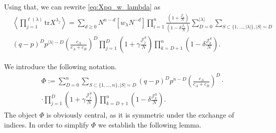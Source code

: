 \documentclass{article}
\newcommand{\tr}{\mathrm{tr}}
\theoremstyle{plain}
\theoremstyle{definition}
\numberwithin{equation}{section}
\begin{document}
Using that, we can rewrite \eqref{eq:Xpq_w_lambda} as
\begin{equation}
    \label{eq:Xpq_less_S}
    \begin{aligned}
        & \left\langle \prod_{j=1}^{\ell(\lambda)} \tr X^{\lambda_{j}} \right\rangle = \sum\limits_{d\ge 0}  N^{n- d} [w_\lambda N^{-d}]\prod_{i=1}^n \frac{\left(1+\frac{\mathcal{J}_i}{N}\right)}{\left(1- \delta \frac{\mathcal{J}_i}{N}\right)} \sum_{D=0}^{|\lambda|}\sum_{S\subset \{1,\dots,|\lambda|\}, |S| = D} \\
        & (q-p)^{D} p^{|\lambda|-D} \left(\frac{c_{A}}{c_{A}+c_{B}}\right)^{D}  \prod_{j=1}^D \left(1+\gamma\frac{\mathcal{J}_j^S}{N}\right) \prod_{k=D+1}^n \left(1- \delta\frac{\mathcal{J}_k^S}{N}\right).
    \end{aligned}
\end{equation}

We introduce the following notation.
\begin{equation}
    \begin{aligned}
        & \Phi := \sum_{D=0}^{n}\sum_{S\subset \{1,\dots,n\}, |S| = D} (q-p)^{D} p^{n-D} \left(\frac{c_{A}}{c_{A}+c_{B}}\right)^{D} \cdot \\
        & \cdot \prod_{j=1}^D \left(1+\gamma\frac{\mathcal{J}_j^S}{N}\right) \prod_{k=D+1}^n \left(1- \delta\frac{\mathcal{J}_k^S}{N}\right).
    \end{aligned}
\end{equation}
The object $\Phi$ is obviously central, as it is symmetric under the exchange of indices. In order to simplify $\Phi$ we establish the following lemma.
\end{document}
